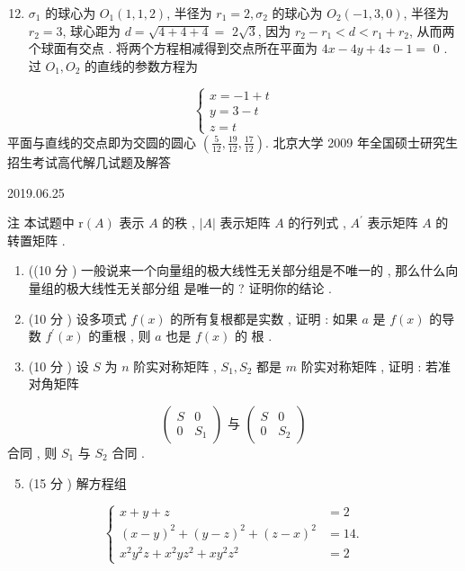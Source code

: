 \documentclass[10pt]{article}
\begin{document}
\begin{enumerate}
  \setcounter{enumi}{11}
  \item $\sigma_{1}$  的球心为  $O_{1}(1,1,2)$,  半径为  $r_{1}=2, \sigma_{2}$  的球心为  $O_{2}(-1,3,0)$,  半径为  $r_{2}=3$,  球心距为  $d=\sqrt{4+4+4}=$ $2 \sqrt{3}$,  因为  $r_{2}-r_{1}<d<r_{1}+r_{2}$,  从而两个球面有交点 .  将两个方程相减得到交点所在平面为  $4 x-4 y+4 z-1=$ 0 .  过  $O_{1}, O_{2}$  的直线的参数方程为 
\end{enumerate}
$$
\left\{\begin{array}{l}
x=-1+t \\
y=3-t \\
z=t
\end{array}\right.
$$
 平面与直线的交点即为交圆的圆心  $\left(\frac{5}{12}, \frac{19}{12}, \frac{17}{12}\right)$.  北京大学  2009  年全国硕士研究生招生考试高代解几试题及解答 

   

2019.06.25

 注   本试题中  $\mathrm{r}(A)$  表示  $A$  的秩 , $|A|$  表示矩阵  $A$  的行列式 , $A^{\prime}$  表示矩阵  $A$  的转置矩阵 .

\begin{enumerate}
  \item ((10  分 )  一般说来一个向量组的极大线性无关部分组是不唯一的 ,  那么什么向量组的极大线性无关部分组   是唯一的 ?  证明你的结论 .

  \item (10  分 )  设多项式  $f(x)$  的所有复根都是实数 ,  证明 :  如果  $a$  是  $f(x)$  的导数  $f^{\prime}(x)$  的重根 ,  则  $a$  也是  $f(x)$  的   根 .

  \item (10  分 )  设  $S$  为  $n$  阶实对称矩阵 , $S_{1}, S_{2}$  都是  $m$  阶实对称矩阵 ,  证明 :  若准对角矩阵 

\end{enumerate}
$$
\left(\begin{array}{cc}
S & 0 \\
0 & S_{1}
\end{array}\right) \text { 与 }\left(\begin{array}{cc}
S & 0 \\
0 & S_{2}
\end{array}\right)
$$
 合同 ,  则  $S_{1}$  与  $S_{2}$  合同 .

\begin{enumerate}
  \setcounter{enumi}{4}
  \item (15  分 )  解方程组 
\end{enumerate}
$$
\left\{\begin{aligned}
x+y+z &=2 \\
(x-y)^{2}+(y-z)^{2}+(z-x)^{2} &=14 . \\
x^{2} y^{2} z+x^{2} y z^{2}+x y^{2} z^{2} &=2
\end{aligned}\right.
$$
\end{document}
